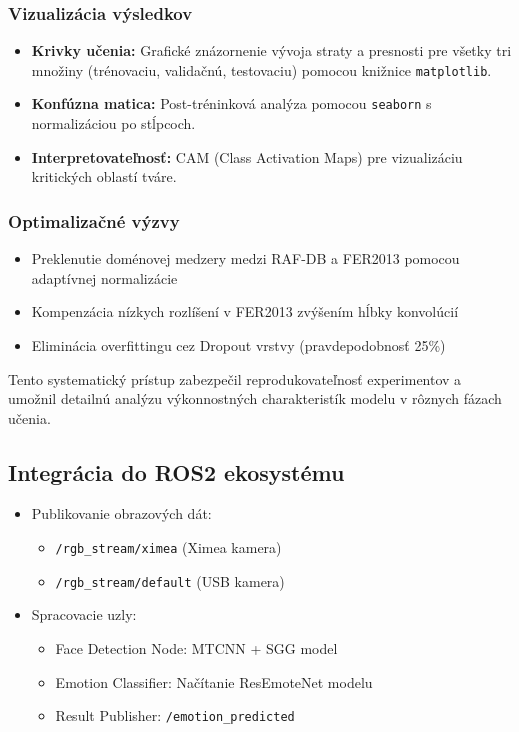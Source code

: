\subsubsection{Vizualizácia výsledkov}
\begin{itemize}
    \item \textbf{Krivky učenia:} Grafické znázornenie vývoja straty a presnosti pre všetky tri množiny (trénovaciu, validačnú, testovaciu) pomocou knižnice \texttt{matplotlib}.
    \item \textbf{Konfúzna matica:} Post-tréninková analýza pomocou \texttt{seaborn} s normalizáciou po stĺpcoch.
    \item \textbf{Interpretovateľnosť:} CAM (Class Activation Maps) pre vizualizáciu kritických oblastí tváre.
\end{itemize}


\subsubsection{Optimalizačné výzvy}
\begin{itemize}
    \item Preklenutie doménovej medzery medzi RAF-DB a FER2013 pomocou adaptívnej normalizácie
    \item Kompenzácia nízkych rozlíšení v FER2013 zvýšením hĺbky konvolúcií
    \item Eliminácia overfittingu cez Dropout vrstvy (pravdepodobnosť 25\%)
\end{itemize}

Tento systematický prístup zabezpečil reprodukovateľnosť experimentov a umožnil detailnú analýzu výkonnostných charakteristík modelu v rôznych fázach učenia.

\subsection{Integrácia do ROS2 ekosystému}
\begin{itemize}
\item Publikovanie obrazových dát:
  \begin{itemize}
  \item \texttt{/rgb\_stream/ximea} (Ximea kamera)
  \item \texttt{/rgb\_stream/default} (USB kamera)
  \end{itemize}
\item Spracovacie uzly:
  \begin{itemize}
  \item Face Detection Node: MTCNN + SGG model
  \item Emotion Classifier: Načítanie ResEmoteNet modelu
  \item Result Publisher: \texttt{/emotion\_predicted}
  \end{itemize}
\end{itemize}

